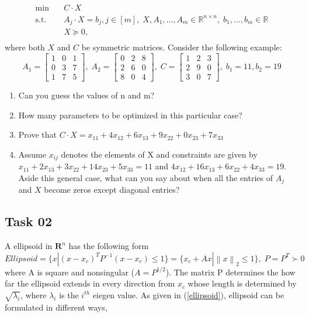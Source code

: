 \documentclass[12pt]{article}%
\begin{document}
\begin{equation}
\begin{aligned}
\min_{} \quad & C\cdot X\\
\textrm{s.t.} \quad & A_j \cdot X = b_j , j \in [m], \; X,A_1,...,A_m \in \mathbb{R}^{n\times n}, \; b_1,...,b_m\in \mathbb{R}\\
  & X \succeq 0,\\
\end{aligned}
\end{equation} where both $X$ and $C$ be symmetric matrices. Consider the following example:
\begin{equation}
    A_1 = \begin{bmatrix}
1 & 0 & 1\\ 
0 & 3 & 7\\ 
1 & 7 & 5
\end{bmatrix}, \; A_2 = \begin{bmatrix}
0 & 2 & 8\\ 
2 & 6 & 0\\ 
8 & 0 & 4
\end{bmatrix}, \; C = \begin{bmatrix}
1 & 2 &3 \\ 
2 & 9 & 0\\ 
3 & 0 &7 
\end{bmatrix}, \; b_1=11, b_2 = 19
\end{equation}

\begin{enumerate}
    \item Can you guess the values of n and m? 
    \item How many parameters to be optimized in this particular case? 
    \item Prove that $C \cdot X = x_{11} + 4x_{12} + 6x_{13} + 9x_{22} + 0x_{23} + 7x_{33}$
    \item Assume $x_{ij}$ denotes the elements of X and constraints are given by $x_{11} + 2x_{13} + 3x_{22} + 14x_{23} +5x_{33} = 11$ and $4x_{12}+16x_{13}+6x_{22}+4x_{33} = 19$. Aside this general case, what can you say about when all the entries of $A_j$ and $X$ become zeros except diagonal entries?
\end{enumerate}

\subsection{Task 02}
A ellipsoid in $\mathbf{R}^n$ has the following form
\begin{equation}\label{ellipsoid}
    Ellipsoid = \{x | (x-x_c)^TP^{-1}(x-x_c) \leq 1\} = \{x_c+Ax|\left \|x \right \|_2 \leq 1 \}, \; P=P^T \succ 0
\end{equation} where A is square and nonsingular ($A=P^{1/2}$). The matrix P determines the how far the ellipsoid extends in every direction from $x_c$ whose length is determined by $\sqrt{\lambda_i}$, where $\lambda_i$ is the $i^{th}$ eiegen value. As given in (\ref{ellipsoid}), ellipsoid can be formulated in different ways, 
\end{document}
